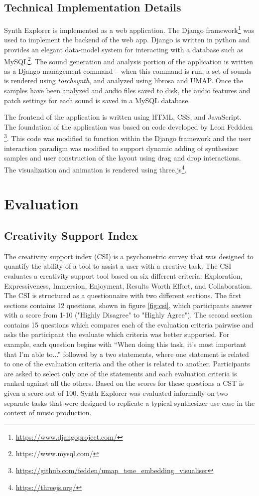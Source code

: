 \subsection{Technical Implementation Details}
Synth Explorer is implemented as a web application. The Django framework\footnote{\url{https://www.djangoproject.com/}} was used to implement the backend of the web app. Django is written in python and provides an elegant data-model system for interacting with a database such as MySQL\footnote{{https://www.mysql.com/}}. The sound generation and analysis portion of the application is written as a Django management command -- when this command is run, a set of sounds is rendered using \textit{torchsynth}, and analyzed using librosa and UMAP. Once the samples have been analyzed and audio files saved to disk, the audio features and patch settings for each sound is saved in a MySQL database.

The frontend of the application is written using HTML, CSS, and JavaScript. The foundation of the application was based on code developed by Leon Feddden \footnote{\url{https://github.com/fedden/umap_tsne_embedding_visualiser}}. This code was modified to function within the Django framework and the user interaction paradigm was modified to support dynamic adding of synthesizer samples and user construction of the layout using drag and drop interactions. The visualization and animation is rendered using three.js\footnote{\url{https://threejs.org/}}.

\section{Evaluation}
\subsection{Creativity Support Index}
The creativity support index (CSI) \cite{cherry2014quantifying} is a psychometric survey that was designed to quantify the ability of a tool to assist a user with a creative task. The CSI evaluates a creativity support tool based on six different criteria: Exploration, Expressiveness, Immersion, Enjoyment, Results Worth Effort, and Collaboration. The CSI is structured as a questionnaire with two different sections. The first sections contains 12 questions, shown in figure \ref{fig:csi}, which participants answer with a score from 1-10 ("Highly Disagree" to "Highly Agree"). The second section contains 15 questions which compares each of the evaluation criteria pairwise and asks the participant the evaluate which criteria was better supported. For example, each question begins with “When doing this task, it’s most important that I’m able to...” followed by a two statements, where one statement is related to one of the evaluation criteria and the other is related to another. Participants are asked to select only one of the statements and each evaluation criteria is ranked against all the others. Based on the scores for these questions a CST is given a score out of 100. Synth Explorer was evaluated informally on two separate tasks that were designed to replicate a typical synthesizer use case in the context of music production.

